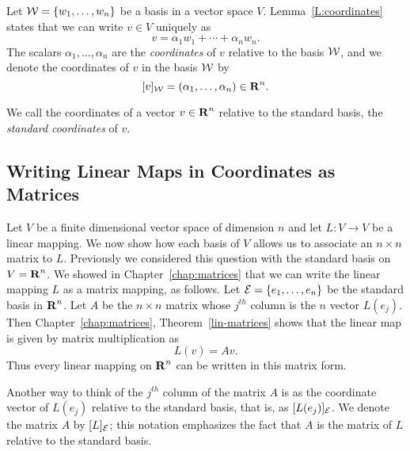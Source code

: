 \begin{Def}  \label{D:coordinates}
Let ${\cal W} = \{w_1,\ldots,w_n\}$ be a basis in a vector space $V$.
Lemma~\ref{L:coordinates} states that we can write $v\in V$ uniquely as
\begin{equation}  \label{e:coordv}
v = \alpha_1w_1 + \cdots + \alpha_nw_n.
\end{equation}
The scalars $\alpha_1,\ldots,\alpha_n$ are the {\em coordinates\/} of $v$
relative to the basis ${\cal W}$, and we denote the coordinates of $v$ in
the basis ${\cal W}$ by
\begin{equation}   \label{e:coordnot}
[v]_{\cal W} = (\alpha_1,\ldots,\alpha_n) \in\mbox{$\bf{R}$}^n.
\end{equation}
\end{Def}

We call the coordinates of a vector $v\in\mbox{$\bf{R}$}^n$ relative to the standard basis,
the {\em standard coordinates\/} of $v$.

\subsection*{Writing Linear Maps in Coordinates as Matrices}

Let $V$ be a finite dimensional vector space of dimension
$n$ and let
$L:V\to V$ be a linear mapping.
We now show how each basis of $V$ allows
us to associate an $n\times n$ matrix to $L$.  Previously we considered
this question with the standard basis on $V=\mbox{$\bf{R}$}^n$. We showed in
Chapter~\ref{chap:matrices} that
we can write the linear mapping $L$ as a
matrix mapping, as
follows.  Let ${\cal E}=\{e_1,\ldots,e_n\}$ be the standard
basis in $\mbox{$\bf{R}$}^n$.  Let $A$ be the $n\times n$ matrix whose
$j^{th}$ column is the $n$ vector $L(e_j)$.  Then
Chapter~\ref{chap:matrices}, Theorem~\ref{lin-matrices} shows
that the linear map is given by matrix multiplication as
\[
L(v) = Av.
\]
Thus every linear mapping on $\mbox{$\bf{R}$}^n$ can be written in this matrix form.

\begin{rmk} \label{R:standard} {\rm
Another way to think of the $j^{th}$ column of the matrix $A$
is as the coordinate vector of $L(e_j)$ relative to the
standard basis, that is, as $[L(e_j)]_{\cal E}$.  We denote the
matrix $A$ by $[L]_{\cal E}$; this notation emphasizes the fact
that $A$ is the matrix of $L$ relative to the standard basis.}
\end{rmk}


